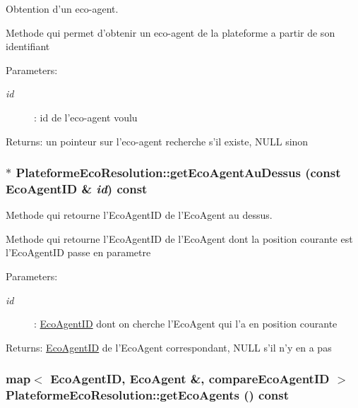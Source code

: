 Obtention d'un eco-agent. 

Methode qui permet d'obtenir un eco-agent de la plateforme a partir de son identifiant

\begin{Desc}
\item[Parameters:]
\begin{description}
\item[{\em id}]: id de l'eco-agent voulu \end{description}
\end{Desc}
\begin{Desc}
\item[Returns:]un pointeur sur l'eco-agent recherche s'il existe, NULL sinon \end{Desc}
\hypertarget{classPlateformeEcoResolution_a33074c437f57bf9f409502de82b2f58}{
\subsubsection[{getEcoAgentAuDessus}]{ $\ast$ PlateformeEcoResolution::getEcoAgentAuDessus (const {\bf EcoAgentID} \& {\em id}) const}}
\label{classPlateformeEcoResolution_a33074c437f57bf9f409502de82b2f58}


Methode qui retourne l'EcoAgentID de l'EcoAgent au dessus. 

Methode qui retourne l'EcoAgentID de l'EcoAgent dont la position courante est l'EcoAgentID passe en parametre

\begin{Desc}
\item[Parameters:]
\begin{description}
\item[{\em id}]: \hyperlink{classEcoAgentID}{EcoAgentID} dont on cherche l'EcoAgent qui l'a en position courante \end{description}
\end{Desc}
\begin{Desc}
\item[Returns:]\hyperlink{classEcoAgentID}{EcoAgentID} de l'EcoAgent correspondant, NULL s'il n'y en a pas \end{Desc}
\hypertarget{classPlateformeEcoResolution_c3c3307a04fbe2d33c753c2b0eef79af}{
\subsubsection[{getEcoAgents}]{\setlength{\rightskip}{0pt plus 5cm}map$<$ {\bf EcoAgentID}, {\bf EcoAgent} \&, {\bf compareEcoAgentID} $>$ PlateformeEcoResolution::getEcoAgents () const}}
\label{classPlateformeEcoResolution_c3c3307a04fbe2d33c753c2b0eef79af}


